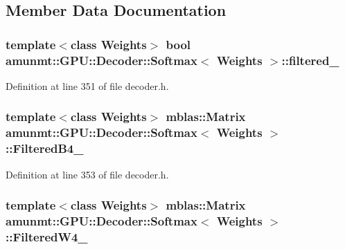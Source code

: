 

\subsection{Member Data Documentation}
\subsubsection[{\texorpdfstring{filtered\+\_\+}{filtered_}}]{\setlength{\rightskip}{0pt plus 5cm}template$<$class Weights$>$ bool {\bf amunmt\+::\+G\+P\+U\+::\+Decoder\+::\+Softmax}$<$ {\bf Weights} $>$\+::filtered\+\_\+\hspace{0.3cm}{\ttfamily [private]}}\hypertarget{classamunmt_1_1GPU_1_1Decoder_1_1Softmax_a302f14f7a0af6f6f16618ee924f7c30a}{}\label{classamunmt_1_1GPU_1_1Decoder_1_1Softmax_a302f14f7a0af6f6f16618ee924f7c30a}


Definition at line 351 of file decoder.\+h.

\subsubsection[{\texorpdfstring{Filtered\+B4\+\_\+}{FilteredB4_}}]{\setlength{\rightskip}{0pt plus 5cm}template$<$class Weights$>$ {\bf mblas\+::\+Matrix} {\bf amunmt\+::\+G\+P\+U\+::\+Decoder\+::\+Softmax}$<$ {\bf Weights} $>$\+::Filtered\+B4\+\_\+\hspace{0.3cm}{\ttfamily [private]}}\hypertarget{classamunmt_1_1GPU_1_1Decoder_1_1Softmax_a88f462fb02369b2aea533ba0bb36d526}{}\label{classamunmt_1_1GPU_1_1Decoder_1_1Softmax_a88f462fb02369b2aea533ba0bb36d526}


Definition at line 353 of file decoder.\+h.

\subsubsection[{\texorpdfstring{Filtered\+W4\+\_\+}{FilteredW4_}}]{\setlength{\rightskip}{0pt plus 5cm}template$<$class Weights$>$ {\bf mblas\+::\+Matrix} {\bf amunmt\+::\+G\+P\+U\+::\+Decoder\+::\+Softmax}$<$ {\bf Weights} $>$\+::Filtered\+W4\+\_\+\hspace{0.3cm}{\ttfamily [private]}}\hypertarget{classamunmt_1_1GPU_1_1Decoder_1_1Softmax_a149cffb41ddd8f888ff26145712f4c7f}{}\label{classamunmt_1_1GPU_1_1Decoder_1_1Softmax_a149cffb41ddd8f888ff26145712f4c7f}


